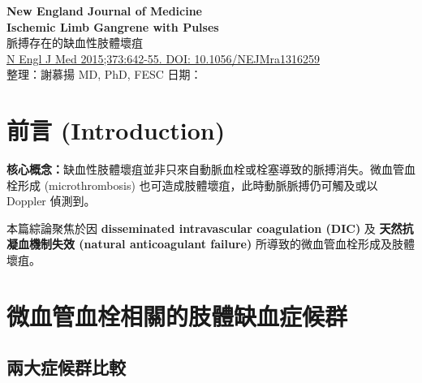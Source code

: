 \documentclass[12pt,a4paper]{article}
\begin{document}
\begin{center}
{\LARGE\bfseries\textcolor{emergency_red}{New England Journal of Medicine}}\\[0.5cm]
{\Large\textbf{Ischemic Limb Gangrene with Pulses}}\\[0.3cm]
{\large 脈搏存在的缺血性肢體壞疽}\\[0.5cm]
{\normalsize \href{https://doi.org/10.1056/NEJMra1316259}{N Engl J Med 2015;373:642-55. DOI: 10.1056/NEJMra1316259}}\\[0.3cm]
{\normalsize 整理：謝慕揚 MD, PhD, FESC \quad 日期：\mydate}
\end{center}

\tableofcontents
\newpage

\section{前言 (Introduction)}

\begin{importantbox}
\textbf{核心概念：}缺血性肢體壞疽並非只來自動脈血栓或栓塞導致的脈搏消失。微血管血栓形成 (microthrombosis) 也可造成肢體壞疽，此時動脈脈搏仍可觸及或以 Doppler 偵測到。
\end{importantbox}

本篇綜論聚焦於因 \textbf{disseminated intravascular coagulation (DIC)} 及 \textbf{天然抗凝血機制失效 (natural anticoagulant failure)} 所導致的微血管血栓形成及肢體壞疽。

\section{微血管血栓相關的肢體缺血症候群}

\subsection{兩大症候群比較}
\end{document}
